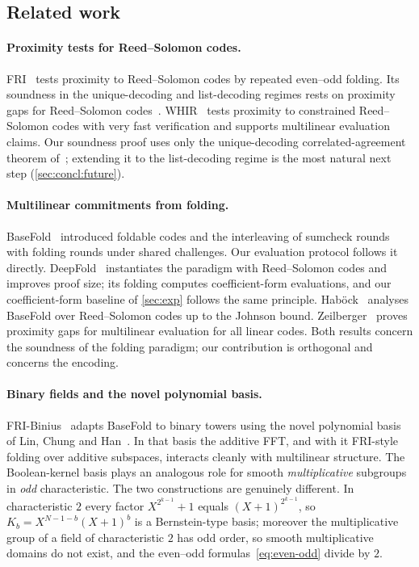 \subsection{Related work}\label{sec:intro:related}

\paragraph{Proximity tests for Reed--Solomon codes.}
FRI~\cite{BBHR18} tests proximity to Reed--Solomon codes by repeated even--odd folding.
Its soundness in the unique-decoding and list-decoding regimes rests on proximity gaps for Reed--Solomon codes~\cite{BCIKS23}.
WHIR~\cite{ACFY24} tests proximity to constrained Reed--Solomon codes with very fast verification and supports multilinear evaluation claims.
Our soundness proof uses only the unique-decoding correlated-agreement theorem of~\cite{BCIKS23}; extending it to the list-decoding regime is the most natural next step (\cref{sec:concl:future}).

\paragraph{Multilinear commitments from folding.}
BaseFold~\cite{ZCF24} introduced foldable codes and the interleaving of sumcheck rounds with folding rounds under shared challenges.
Our evaluation protocol follows it directly.
DeepFold~\cite{GLHQTZ25} instantiates the paradigm with Reed--Solomon codes and improves proof size; its folding computes coefficient-form evaluations, and our coefficient-form baseline of \cref{sec:exp} follows the same principle.
Hab\"ock~\cite{Hab24} analyses BaseFold over Reed--Solomon codes up to the Johnson bound.
Zeilberger~\cite{Zei26} proves proximity gaps for multilinear evaluation for all linear codes.
Both results concern the soundness of the folding paradigm; our contribution is orthogonal and concerns the encoding.

\paragraph{Binary fields and the novel polynomial basis.}
FRI-Binius~\cite{DP24} adapts BaseFold to binary towers using the novel polynomial basis of Lin, Chung and Han~\cite{LCH14}.
In that basis the additive FFT, and with it FRI-style folding over additive subspaces, interacts cleanly with multilinear structure.
The Boolean-kernel basis plays an analogous role for smooth \emph{multiplicative} subgroups in \emph{odd} characteristic.
The two constructions are genuinely different. In characteristic $2$ every factor $X^{2^{k-1}} + 1$ equals $(X+1)^{2^{k-1}}$, so $K_b = X^{N-1-b}(X+1)^{b}$ is a Bernstein-type basis; moreover the multiplicative group of a field of characteristic $2$ has odd order, so smooth multiplicative domains do not exist, and the even--odd formulas~\eqref{eq:even-odd} divide by $2$.

